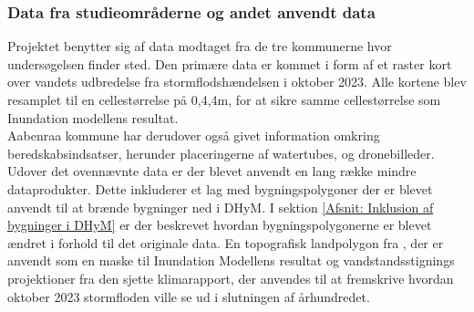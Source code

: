 \subsubsection{Data fra studieområderne og andet anvendt data} \label{Afsnit: Data fra studieområderne og andet anvendt data}
Projektet benytter sig af data modtaget fra de tre kommunerne hvor undersøgelsen finder sted. Den primære data er kommet i form af et raster kort over vandets udbredelse fra stormflodshændelsen i oktober 2023. Alle kortene blev resamplet til en cellestørrelse på 0,4,4m, for at sikre samme cellestørrelse som Inundation modellens resultat. \\
Aabenraa kommune har derudover også givet information omkring beredskabsindsatser, herunder placeringerne af watertubes, og dronebilleder. \\ 


Udover det ovennævnte data er der blevet anvendt en lang række mindre dataprodukter. 
Dette inkluderer et lag med bygningspolygoner der er blevet anvendt til at brænde bygninger ned i DHyM. I sektion \ref{Afsnit: Inklusion af bygninger i DHyM} er der beskrevet hvordan bygningspolygonerne er blevet ændret i forhold til det originale data. En topografisk landpolygon fra \cite{klimadatastyrelsen_landpolygon}, der er anvendt som en maske til Inundation Modellens resultat og vandstandsstignings projektioner fra den sjette \cite{ipcc_report_AR6, NASA_tool} klimarapport, der anvendes til at fremskrive hvordan oktober 2023 stormfloden ville se ud i slutningen af århundredet. 